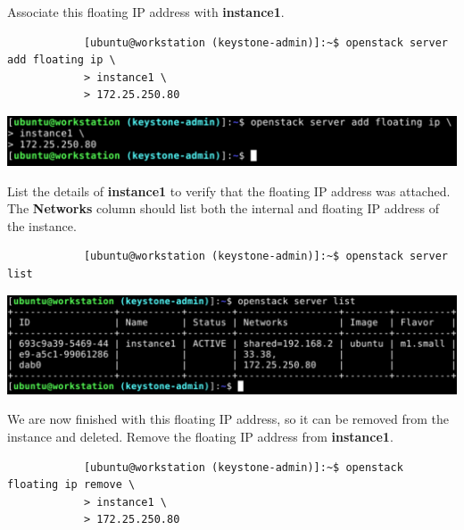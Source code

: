 \documentclass[letterpaper, 12pt]{article}
\begin{document}
\begin{enumerate}
    \begin{labstep}
        Associate this floating IP address with \textbf{instance1}.
        \begin{lstlisting}
            [ubuntu@workstation (keystone-admin)]:~$ openstack server add floating ip \
            > instance1 \
            > 172.25.250.80
        \end{lstlisting}

        \begin{center}
            \includegraphics[width=\linewidth]{images/part3/step18.png}
        \end{center}
    \end{labstep}

    \begin{labstep}
        List the details of \textbf{instance1} to verify that the floating IP address was attached.
        The \textbf{Networks} column should list both the internal and floating IP address of the instance.
        \begin{lstlisting}
            [ubuntu@workstation (keystone-admin)]:~$ openstack server list
        \end{lstlisting}

        \begin{center}
            \includegraphics[width=\linewidth]{images/part3/step19.png}
        \end{center}
    \end{labstep}

    \begin{labstep}
        We are now finished with this floating IP address, so it can be removed from the instance and deleted.
        Remove the floating IP address from \textbf{instance1}.
        \begin{lstlisting}
            [ubuntu@workstation (keystone-admin)]:~$ openstack floating ip remove \
            > instance1 \
            > 172.25.250.80
        \end{lstlisting}


\end{labstep}
\end{enumerate}
\end{document}
